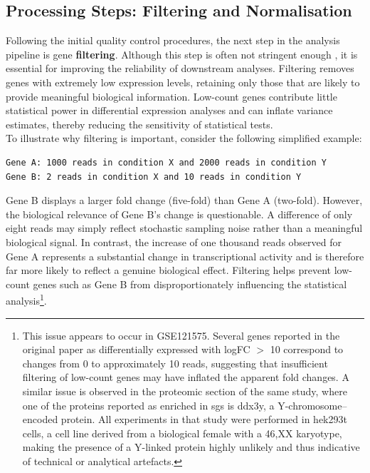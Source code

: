 \subsection{Processing Steps: Filtering and Normalisation}

Following the initial quality control procedures, the next step in the analysis pipeline is gene \textbf{filtering}. Although this step is often not stringent enough \cite{padron_proximity_2019, shen_sexually_2022}, it is essential for improving the reliability of downstream analyses. Filtering removes genes with extremely low expression levels, retaining only those that are likely to provide meaningful biological information. Low-count genes contribute little statistical power in differential expression analyses and can inflate variance estimates, thereby reducing the sensitivity of statistical tests\cite{costa_uncovering_2010}.
\\
\linebreak
\noindent
To illustrate why filtering is important, consider the following simplified example:
\begin{verbatim}
Gene A: 1000 reads in condition X and 2000 reads in condition Y
Gene B: 2 reads in condition X and 10 reads in condition Y
\end{verbatim}
Gene B displays a larger fold change (five-fold) than Gene A (two-fold). However, the biological relevance of Gene B’s change is questionable. A difference of only eight reads may simply reflect stochastic sampling noise rather than a meaningful biological signal. In contrast, the increase of one thousand reads observed for Gene A represents a substantial change in transcriptional activity and is therefore far more likely to reflect a genuine biological effect. Filtering helps prevent low-count genes such as Gene B from disproportionately influencing the statistical analysis\footnote{This issue appears to occur in GSE121575\cite{padron_proximity_2019}. Several genes reported in the original paper as differentially expressed with logFC $>$ 10 correspond to changes from 0 to approximately 10 reads, suggesting that insufficient filtering of low-count genes may have inflated the apparent fold changes. A similar issue is observed in the proteomic section of the same study, where one of the proteins reported as enriched in \glspl{sg} is \gls{ddx3y}, a Y-chromosome–encoded protein. All experiments in that study were performed in \gls{hek293t} cells, a cell line derived from a biological female with a 46,XX karyotype, making the presence of a Y-linked protein highly unlikely and thus indicative of technical or analytical artefacts.}.
